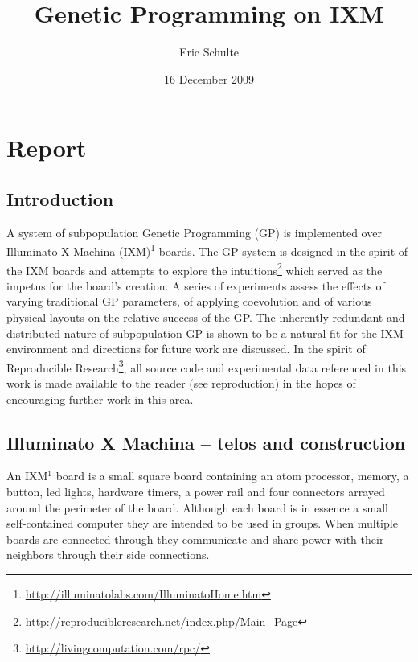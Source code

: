 \documentclass[11pt]{article}
\title{Genetic Programming on IXM}
\author{Eric Schulte}
\date{16 December 2009}
\begin{document}
\maketitle



\section*{Report}
\label{sec-1}

\subsection*{Introduction}
\label{sec-1.1}

A system of subpopulation Genetic Programming (GP) is implemented over
Illuminato X Machina (IXM)\footnote{\href{http://illuminatolabs.com/IlluminatoHome.htm}{http://illuminatolabs.com/IlluminatoHome.htm} } boards.  The GP system is designed in
the spirit of the IXM boards and attempts to explore the
intuitions\footnote{\href{http://reproducibleresearch.net/index.php/Main_Page}{http://reproducibleresearch.net/index.php/Main\_Page} } which served as the impetus for the board's creation.
A series of experiments assess the effects of varying traditional GP
parameters, of applying coevolution and of various physical layouts on
the relative success of the GP.  The inherently redundant and
distributed nature of subpopulation GP is shown to be a natural fit
for the IXM environment and directions for future work are discussed.
In the spirit of Reproducible Research\footnote{\href{http://livingcomputation.com/rpc/}{http://livingcomputation.com/rpc/} }, all source code and
experimental data referenced in this work is made available to the
reader (see \hyperref[sec-1.8]{reproduction}) in the hopes of encouraging further work in
this area.

\subsection*{Illuminato X Machina -- telos and construction}
\label{sec-1.2}

An IXM$^{1}$ board is a small square board containing an atom
processor, memory, a button, led lights, hardware timers, a power rail
and four connectors arrayed around the perimeter of the board.
Although each board is in essence a small self-contained computer they
are intended to be used in groups.  When multiple boards are connected
through they communicate and share power with their neighbors through
their side connections.
\end{document}
